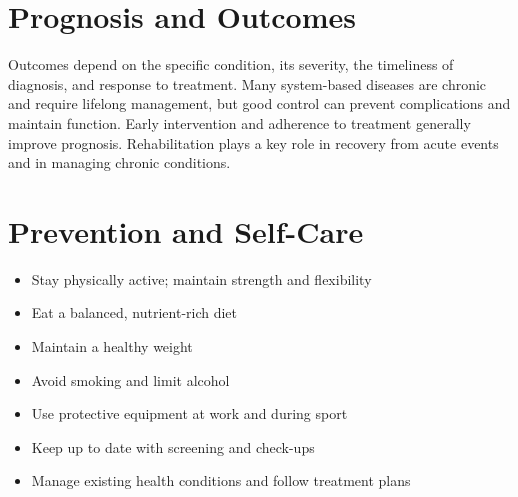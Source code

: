 \section*{Prognosis and Outcomes}
Outcomes depend on the specific condition, its severity, the timeliness of diagnosis, and response to treatment. Many system-based diseases are chronic and require lifelong management, but good control can prevent complications and maintain function. Early intervention and adherence to treatment generally improve prognosis. Rehabilitation plays a key role in recovery from acute events and in managing chronic conditions.

\section*{Prevention and Self-Care}
\begin{itemize}
    \item Stay physically active; maintain strength and flexibility
    \item Eat a balanced, nutrient-rich diet
    \item Maintain a healthy weight
    \item Avoid smoking and limit alcohol
    \item Use protective equipment at work and during sport
    \item Keep up to date with screening and check-ups
    \item Manage existing health conditions and follow treatment plans
\end{itemize}
